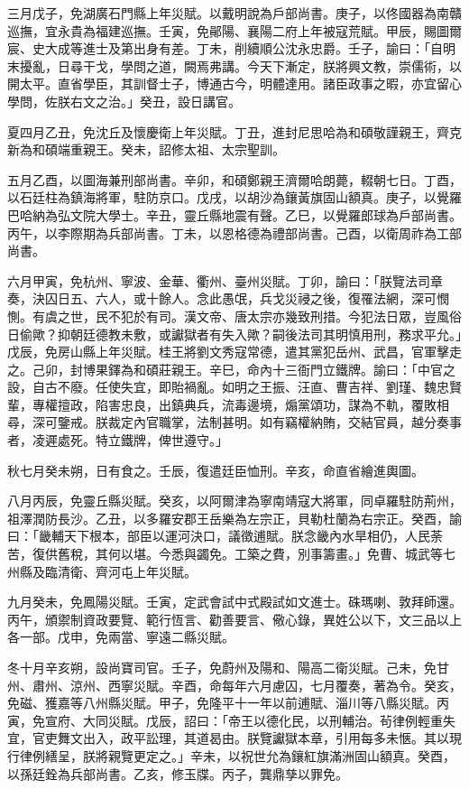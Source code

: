 \begin{pinyinscope}
三月戊子，免湖廣石門縣上年災賦。以戴明說為戶部尚書。庚子，以佟國器為南贛巡撫，宜永貴為福建巡撫。壬寅，免鄖陽、襄陽二府上年被寇荒賦。甲辰，賜圖爾宸、史大成等進士及第出身有差。丁未，削續順公沈永忠爵。壬子，諭曰：「自明末擾亂，日尋干戈，學問之道，闕焉弗講。今天下漸定，朕將興文教，崇儒術，以開太平。直省學臣，其訓督士子，博通古今，明體達用。諸臣政事之暇，亦宜留心學問，佐朕右文之治。」癸丑，設日講官。

夏四月乙丑，免沈丘及懷慶衛上年災賦。丁丑，進封尼思哈為和碩敬謹親王，齊克新為和碩端重親王。癸未，詔修太祖、太宗聖訓。

五月乙酉，以圖海兼刑部尚書。辛卯，和碩鄭親王濟爾哈朗薨，輟朝七日。丁酉，以石廷柱為鎮海將軍，駐防京口。戊戌，以胡沙為鑲黃旗固山額真。庚子，以覺羅巴哈納為弘文院大學士。辛丑，靈丘縣地震有聲。乙巳，以覺羅郎球為戶部尚書。丙午，以李際期為兵部尚書。丁未，以恩格德為禮部尚書。己酉，以衛周祚為工部尚書。

六月甲寅，免杭州、寧波、金華、衢州、臺州災賦。丁卯，諭曰：「朕覽法司章奏，決囚日五、六人，或十餘人。念此愚氓，兵戈災祲之後，復罹法網，深可憫惻。有虞之世，民不犯於有司。漢文帝、唐太宗亦幾致刑措。今犯法日眾，豈風俗日偷歟？抑朝廷德教未敷，或讞獄者有失入歟？嗣後法司其明慎用刑，務求平允。」戊辰，免房山縣上年災賦。桂王將劉文秀寇常德，遣其黨犯岳州、武昌，官軍擊走之。己卯，封博果鐸為和碩莊親王。辛巳，命內十三衙門立鐵牌。諭曰：「中官之設，自古不廢。任使失宜，即貽禍亂。如明之王振、汪直、曹吉祥、劉瑾、魏忠賢輩，專權擅政，陷害忠良，出鎮典兵，流毒邊境，煽黨頌功，謀為不軌，覆敗相尋，深可鑒戒。朕裁定內官職掌，法制甚明。如有竊權納賄，交結官員，越分奏事者，凌遲處死。特立鐵牌，俾世遵守。」

秋七月癸未朔，日有食之。壬辰，復遣廷臣恤刑。辛亥，命直省繪進輿圖。

八月丙辰，免靈丘縣災賦。癸亥，以阿爾津為寧南靖寇大將軍，同卓羅駐防荊州，祖澤潤防長沙。乙丑，以多羅安郡王岳樂為左宗正，貝勒杜蘭為右宗正。癸酉，諭曰：「畿輔天下根本，部臣以運河決口，議徵逋賦。朕念畿內水旱相仍，人民荼苦，復供舊稅，其何以堪。今悉與蠲免。工築之費，別事籌畫。」免曹、城武等七州縣及臨清衛、齊河屯上年災賦。

九月癸未，免鳳陽災賦。壬寅，定武會試中式殿試如文進士。硃瑪喇、敦拜師還。丙午，頒禦制資政要覽、範行恆言、勸善要言、儆心錄，異姓公以下，文三品以上各一部。戊申，免兩當、寧遠二縣災賦。

冬十月辛亥朔，設尚寶司官。壬子，免蔚州及陽和、陽高二衛災賦。己未，免甘州、肅州、涼州、西寧災賦。辛酉，命每年六月慮囚，七月覆奏，著為令。癸亥，免磁、獲嘉等八州縣災賦。甲子，免隆平十一年以前逋賦、淄川等八縣災賦。丙寅，免宣府、大同災賦。戊辰，詔曰：「帝王以德化民，以刑輔治。茍律例輕重失宜，官吏舞文出入，政平訟理，其道曷由。朕覽讞獄本章，引用每多未愜。其以現行律例繕呈，朕將親覽更定之。」辛未，以祝世允為鑲紅旗滿洲固山額真。癸酉，以孫廷銓為兵部尚書。乙亥，修玉牒。丙子，龔鼎孳以罪免。


\end{pinyinscope}
